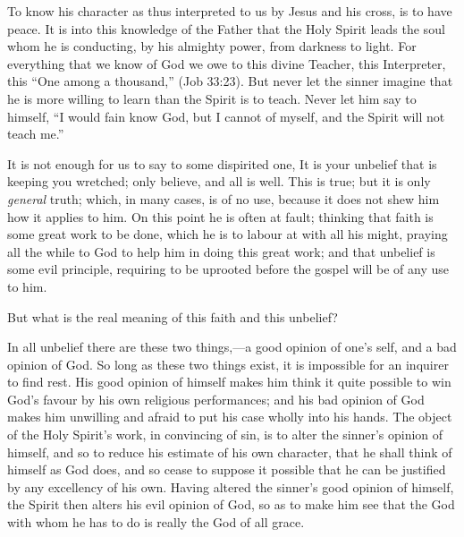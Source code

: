 \documentclass[
]{book}
\begin{document}
To know his character as thus interpreted to us by Jesus and his cross, is to have peace. It is into this knowledge of the Father that the Holy Spirit leads the soul whom he is conducting, by his almighty power, from darkness to light. For everything that we know of God we owe to this divine Teacher, this Interpreter, this ``One among a thousand,'' (Job 33:23). But never let the sinner imagine that he is more willing to learn than the Spirit is to teach. Never let him say to himself, ``I would fain know God, but I cannot of myself, and the Spirit will not teach me.''

It is not enough for us to say to some dispirited one, It is your unbelief that is keeping you wretched; only believe, and all is well. This is true; but it is only \emph{general} truth; which, in many cases, is of no use, because it does not shew him how it applies to him. On this point he is often at fault; thinking that faith is some great work to be done, which he is to labour at with all his might, praying all the while to God to help him in doing this great work; and that unbelief is some evil principle, requiring to be uprooted before the gospel will be of any use to him.

But what is the real meaning of this faith and this unbelief?

In all unbelief there are these two things,---a good opinion of one's self, and a bad opinion of God. So long as these two things exist, it is impossible for an inquirer to find rest. His good opinion of himself makes him think it quite possible to win God's favour by his own religious performances; and his bad opinion of God makes him unwilling and afraid to put his case wholly into his hands. The object of the Holy Spirit's work, in convincing of sin, is to alter the sinner's opinion of himself, and so to reduce his estimate of his own character, that he shall think of himself as God does, and so cease to suppose it possible that he can be justified by any excellency of his own. Having altered the sinner's good opinion of himself, the Spirit then alters his evil opinion of God, so as to make him see that the God with whom he has to do is really the God of all grace.
\end{document}
